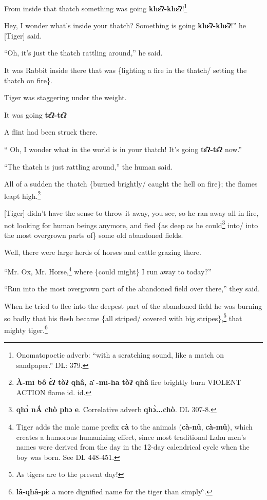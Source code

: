 From inside that thatch something was going \textbf{khɛ̂ʔ-khɛ̂ʔ}!\footnote{Onomatopoetic adverb: ``with a scratching sound, like a match on sandpaper.'' DL: 379.}

Hey, I wonder what's inside your thatch? Something is going \textbf{khɛ̂ʔ-khɛ̂ʔ}!''
he [Tiger] said.

``Oh, it's just the thatch rattling around,'' he said.

It was Rabbit inside there that was \{lighting a fire in the thatch/ setting the
thatch on fire\}.

Tiger was staggering under the weight.

It was going \textbf{tɛ̂ʔ-tɛ̂ʔ}

A flint had been struck there.

`` Oh, I wonder what in the world is in your thatch! It's going \textbf{tɛ̂ʔ-tɛ̂ʔ}
now.''

``The thatch is just rattling around,'' the human said.

All of a sudden the thatch \{burned brightly/ caught the hell on fire\}; the flames
leapt high.\footnote{\textbf{ À-mī  bô ɛ̀ʔ  tòʔ   qhâ, a 	̀-mī-ha tòʔ qhâ} fire brightly burn VIOLENT ACTION flame    id.  id.}

[Tiger] didn't have the sense to throw it away, you see, so he ran away all in
fire, not looking for human beings anymore, and fled \{as deep as he could\footnote{\textbf{ qhɔ̀ nÁ chò phɔ e}. Correlative adverb \textbf{qhɔ̀...chò}. DL 307-8.}
into/ into the most overgrown parts of\} some old abandoned fields.

Well, there were large herds of horses and cattle grazing there.

``Mr. Ox, Mr. Horse,\footnote{Tiger adds the male name prefix \textbf{cà} to the animals (\textbf{cà-nû}, \textbf{cà-mû}), which creates a humorous humanizing effect, since most traditional Lahu men's names were derived from the day in the 12-day calendrical cycle when the boy was born. See DL 448-451.} where \{could might\} I run away to today?''

``Run into the most overgrown part of the abandoned field over there,'' they said.

When he tried to flee into the deepest part of the abandoned field he was burning
so badly that his flesh became \{all striped/ covered with big stripes\},\footnote{As tigers are to the present day!} that
mighty tiger.\footnote{\textbf{lâ-qhâ-pɨ}: a more dignified name for the tiger than simply\textbf{ ̂}.}

